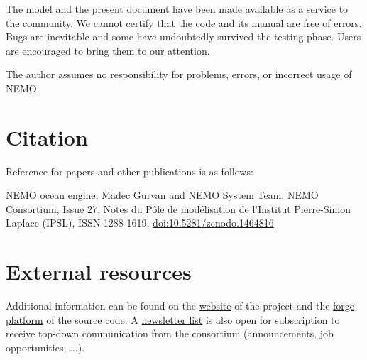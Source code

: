 \documentclass[../main/NEMO_manual]{subfiles}
\begin{document}
The model and the present document have been made available as a service to the community.
We cannot certify that the code and its manual are free of errors.
Bugs are inevitable and some have undoubtedly survived the testing phase.
Users are encouraged to bring them to our attention.

The author assumes no responsibility for problems, errors, or incorrect usage of NEMO.

\section*{Citation}

Reference for papers and other publications is as follows:
\vspace{0.5cm}

{\sffamily
NEMO ocean engine,
Madec Gurvan and NEMO System Team, NEMO Consortium,
Issue 27, Notes du Pôle de modélisation de l'Institut Pierre-Simon Laplace (IPSL), ISSN 1288-1619,
\href{http://doi.org/10.5281/zenodo.1464816}{doi:10.5281/zenodo.1464816}
}

\section*{External resources}

Additional information can be found on the \href{http://www.nemo-ocean.eu}{website} of the project and
the \href{http://forge.ipsl.jussieu.fr/nemo}{forge platform} of the source code.
A \href{http://listes.ipsl.fr/sympa/info/nemo-newsletter}{newsletter list} is also open for subscription to
receive top-down communication from the consortium (announcements, job opportunities, ...).

\biblio

\pindex
\end{document}
